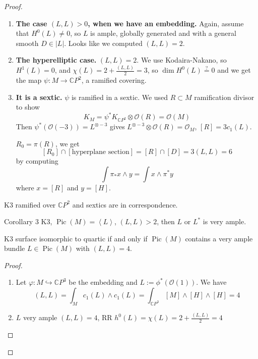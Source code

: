 \begin{proof}\leavevmode
\begin{enumerate}[label=\textbf{Step \arabic*}]
	\item \textbf{The case $(L,L)>0$, when we have an embedding.}\hspace{0.5em} Again, assume that $H^{0}(L)\neq 0$, so $L$ is ample, globally generated and with a general smooth $D\in |L|$. Looks like we computed $(L,L)=2$.

	\item  \textbf{The hyperelliptic case.}\hspace{0.5em} $(L,L)=2$. We use Kodaira-Nakano, so  $H^{1}(L)=0$, and $\chi(L)=2+\frac{(L,L)}{2}=3$, so $\dim H^{0}(L)\overset{?}{=}0$ and we get the map $\psi:M\to \mathbb{C}P^{2}$, a ramified covering.

	\item \textbf{It is a sextic.} \hspace{0.5em} $\psi$ is ramified in a sextic. We used $R\subset M$ ramification divisor to show
		\[K_M=\psi^* K_{\mathbb{C}P^{2}}\otimes \mathcal{O}(R)=\mathcal{O}(M)\]
		Then $\psi^* (\mathcal{O}(-3))=L^{\otimes-3}$ gives $L^{\otimes-3}\otimes \mathcal{O}(R)=\mathcal{O}_M$, $[R]=3c_1(L)$.
		
		$R_0=\pi(R)$, we get
		\[ [R_0] \cap [\text{hyperplane section}]=[R]\cap [D]=3(L,L)=6 \]
		by computing
		\[\int \pi_* x\wedge y=\int x\wedge \pi^*y\]
		where $x=[R]$ and  $y=[H]$.
\end{enumerate}

\begin{remark}[Check!]\leavevmode
	K3 ramified over $\mathbb{C}P^{2}$ and sextics are in correspondence.
\end{remark}

\begin{thing4}{Corollary 3}\leavevmode
	K3, $\operatorname{Pic}(M)= \left<L\right> $, $(L,L)>2$, then  $L$ or $L^*$ is very ample.
\end{thing4}

\begin{prop}\leavevmode
	K3 surface isomorphic to quartic if and only if $\operatorname{Pic}(M)$ contains a very ample bundle $L\in\operatorname{Pic}(M)$ with $(L,L)=4$. 
\end{prop}

\begin{proof}\leavevmode
	\begin{enumerate}[label=\textbf{Step \arabic*}]
		\item Let $\varphi:M\hookrightarrow \mathbb{C}P^{3}$ be the embedding and $L:=\phi^*(\mathcal{O}(1))$. We have
			\[(L,L)=\int_{M}c_1(L)\wedge c_1(L)=\int_{\mathbb{C}P^{3}}[M]\wedge [H]\wedge [H]=4\]
			\item $L$ very ample $(L,L)=4$, RR $h^{0}(L)=\chi(L)=2+\frac{(L,L)}{2}=4$
	\end{enumerate}
\end{proof}


\end{proof}
